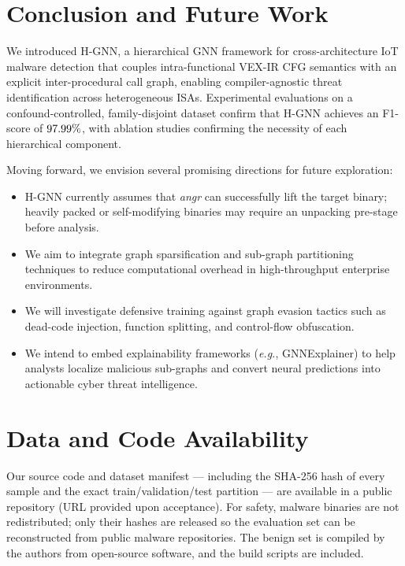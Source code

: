 \documentclass[conference]{IEEEtran}
\newcommand{\method}{H-GNN}
\begin{document}
\section{Conclusion and Future Work}
\label{sec:conclusion}

We introduced \method{}, a hierarchical GNN framework for cross-architecture
IoT malware detection that couples intra-functional VEX-IR CFG semantics
with an explicit inter-procedural call graph, enabling compiler-agnostic
threat identification across heterogeneous ISAs.
Experimental evaluations on a confound-controlled, family-disjoint
dataset confirm that \method{} achieves an F1-score of $97.99\%$, with
ablation studies confirming the necessity of each hierarchical component.

Moving forward, we envision several promising directions for future exploration:
\begin{itemize}
    \item {} \method{} currently assumes that \textit{angr}
    can successfully lift the target binary; heavily packed or self-modifying
    binaries may require an unpacking pre-stage before analysis.
    \item {} We aim to integrate
    graph sparsification and sub-graph partitioning techniques to reduce
    computational overhead in high-throughput enterprise environments.
    \item {} We will investigate defensive
    training against graph evasion tactics such as dead-code injection,
    function splitting, and control-flow obfuscation.
    \item {} We intend
    to embed explainability frameworks (\textit{e.g.}, GNNExplainer) to help
    analysts localize malicious sub-graphs and convert neural predictions into
    actionable cyber threat intelligence.
\end{itemize}


\section*{Data and Code Availability}
Our source code and dataset manifest --- including the SHA-256 hash of every sample and the exact
train/validation/test partition --- are available in a public repository (URL provided upon acceptance). For safety, malware binaries
are not redistributed; only their hashes are released so the evaluation set can be reconstructed from
public malware repositories. The benign set is compiled by the authors from open-source software, and
the build scripts are included.
\end{document}
